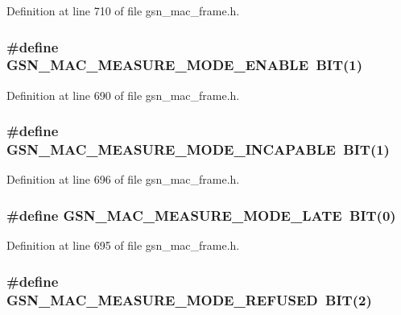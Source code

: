 Definition at line 710 of file gsn\_\-mac\_\-frame.h.

\hypertarget{a00523_a85d4e004191c509e0b7213d2d18a50ec}{
\subsubsection[{GSN\_\-MAC\_\-MEASURE\_\-MODE\_\-ENABLE}]{\setlength{\rightskip}{0pt plus 5cm}\#define GSN\_\-MAC\_\-MEASURE\_\-MODE\_\-ENABLE~BIT(1)}}
\label{a00523_a85d4e004191c509e0b7213d2d18a50ec}


Definition at line 690 of file gsn\_\-mac\_\-frame.h.

\hypertarget{a00523_a97ec343e001bbeebc2457054e6ee30e6}{
\subsubsection[{GSN\_\-MAC\_\-MEASURE\_\-MODE\_\-INCAPABLE}]{\setlength{\rightskip}{0pt plus 5cm}\#define GSN\_\-MAC\_\-MEASURE\_\-MODE\_\-INCAPABLE~BIT(1)}}
\label{a00523_a97ec343e001bbeebc2457054e6ee30e6}


Definition at line 696 of file gsn\_\-mac\_\-frame.h.

\hypertarget{a00523_a4a61b205dba0589b68f26d713934b06d}{
\subsubsection[{GSN\_\-MAC\_\-MEASURE\_\-MODE\_\-LATE}]{\setlength{\rightskip}{0pt plus 5cm}\#define GSN\_\-MAC\_\-MEASURE\_\-MODE\_\-LATE~BIT(0)}}
\label{a00523_a4a61b205dba0589b68f26d713934b06d}


Definition at line 695 of file gsn\_\-mac\_\-frame.h.

\hypertarget{a00523_ad5e91bc3252a5b6bc9812e990958bd15}{
\subsubsection[{GSN\_\-MAC\_\-MEASURE\_\-MODE\_\-REFUSED}]{\setlength{\rightskip}{0pt plus 5cm}\#define GSN\_\-MAC\_\-MEASURE\_\-MODE\_\-REFUSED~BIT(2)}}
\label{a00523_ad5e91bc3252a5b6bc9812e990958bd15}


